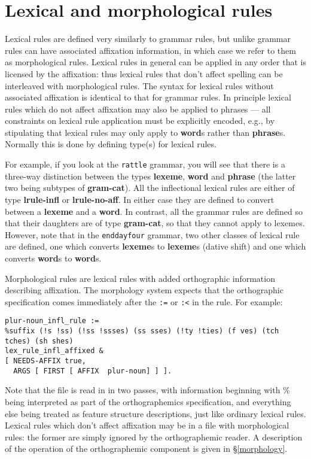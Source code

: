 \documentclass[12pt]{report}
\begin{document}
\section{Lexical and morphological rules}
\label{lrules}

Lexical rules are defined very similarly to grammar rules, but 
unlike grammar rules can have associated affixation information,
in which case we refer to them as morphological rules.
Lexical rules in general can be applied in any order that is
licensed by the affixation: thus lexical rules that don't
affect spelling can be interleaved with morphological rules.
The syntax for lexical rules without associated affixation
is identical to that for grammar rules.
In principle
lexical rules which do not affect affixation
may also be applied to phrases ---
all constraints on lexical rule application must be explicitly encoded,
e.g., by stipulating that lexical rules may only apply
to {\bf word}s rather than {\bf phrase}s.
Normally this is done by defining type(s) for lexical rules.

For example, if you look at the {\tt rattle} grammar, you will see that
there is a three-way distinction between the types {\bf lexeme},
{\bf word} and {\bf phrase} (the latter two being subtypes of
{\bf gram-cat}).
All the inflectional lexical rules
are either of type {\bf lrule-infl} or {\bf lrule-no-aff}.  In either
case they are defined to convert between a {\bf lexeme} and a {\bf word}.
In contrast, all the grammar rules are defined so that their daughters
are of type {\bf gram-cat}, so that they cannot apply to lexemes.
However, note that in the {\tt enddayfour} grammar, two other classes
of lexical rule are defined, one which converts {\bf lexeme}s to 
{\bf lexeme}s (dative shift) and one which converts {\bf word}s to
{\bf word}s.  

Morphological rules are lexical
rules with added orthographic
information describing affixation.
The morphology system expects that the
orthographic specification comes immediately after the 
{\tt :=} or {\tt :<} in the rule.
For example:
\begin{verbatim}
plur-noun_infl_rule :=
%suffix (!s !ss) (!ss !ssses) (ss sses) (!ty !ties) (f ves) (tch tches) (sh shes)
lex_rule_infl_affixed &
[ NEEDS-AFFIX true,
  ARGS [ FIRST [ AFFIX  plur-noun] ] ].
\end{verbatim}

Note that the file is read in in two passes, with information beginning
with \% being interpreted as part of the orthographemics specification,
and everything else being treated as feature structure descriptions,
just like ordinary lexical rules.
Lexical rules which don't affect affixation may be in a file
with morphological rules: the
former are simply ignored by the orthographemic
reader.
A description of the operation of the orthographemic component is
given in \S\ref{morphology}.
\end{document}
